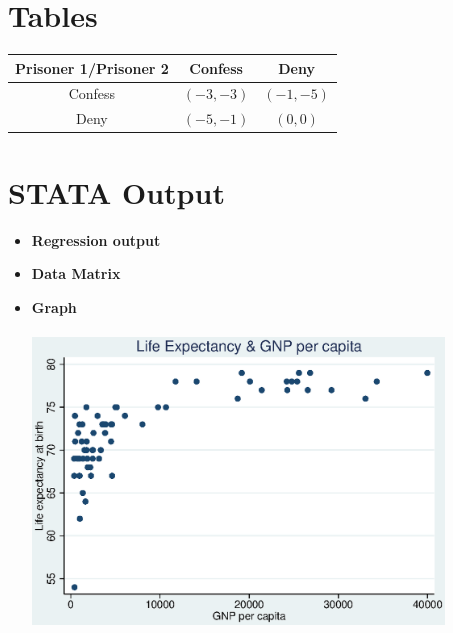 \documentclass{article}
\begin{document}
\section{Tables}
	\begin{tabular}{|c|c|c|}
	\hline Prisoner 1/Prisoner 2 & Confess & Deny \\ 
	\hline Confess & $(-3,-3)$ & $(-1,-5)$ \\ 
	\hline Deny & $(-5,-1)$ & $(0,0)$ \\ 
	\hline 
	\end{tabular} 
	
\newpage	
\section{STATA Output}
	\begin{itemize}
	\item \textbf{Regression output}
		
		
	\item \textbf{Data Matrix} \\
		
		
	\newpage	
	\item \textbf{Graph} \\
	\\
		  \includegraphics[height=3in]{lexp_gnp1.eps} 	
	
	\end{itemize}
	
	
\end{document}
